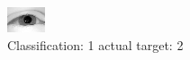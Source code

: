 \begin{figure}[h!]
\begin{center}
\includegraphics[width=0.60\columnwidth]{figures/ID2318_class_1_target_2.png}
\end{center}
\caption{ Classification: 1 actual target: 2}
\label{fig:ID2318_class_1_target_2}
\end{figure}
